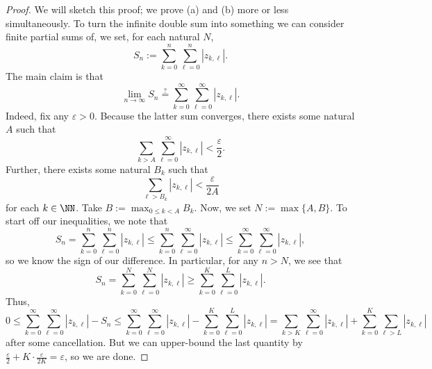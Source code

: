 \begin{proof}
	We will sketch this proof; we prove (a) and (b) more or less simultaneously. To turn the infinite double sum into something we can consider finite partial sums of, we set, for each natural $N$,
	\[S_n:=\sum_{k=0}^n\sum_{\ell=0}^n|z_{k,\ell}|.\]
	The main claim is that
	\[\lim_{n\to\infty}S_n\stackrel?=\sum_{k=0}^\infty\sum_{\ell=0}^\infty|z_{k,\ell}|.\]
	Indeed, fix any $\varepsilon>0$. Because the latter sum converges, there exists some natural $A$ such that
	\[\sum_{k>A}\sum_{\ell=0}^\infty|z_{k,\ell}|<\frac\varepsilon2.\]
	Further, there exists some natural $B_k$ such that
	\[\sum_{\ell>B_k}|z_{k,\ell}|<\frac\varepsilon{2A}\]
	for each $k\in\NN$. Take $B:=\max_{0\le k<A}B_k$. Now, we set $N:=\max\{A,B\}$. To start off our inequalities, we note that
	\[S_n=\sum_{k=0}^n\sum_{\ell=0}^n|z_{k,\ell}|\le\sum_{k=0}^n\sum_{\ell=0}^\infty|z_{k,\ell}|\le\sum_{k=0}^\infty\sum_{\ell=0}^\infty|z_{k,\ell}|,\]
	so we know the sign of our difference. In particular, for any $n>N$, we see that
	\[S_n=\sum_{k=0}^N\sum_{\ell=0}^N|z_{k,\ell}|\ge\sum_{k=0}^K\sum_{\ell=0}^L|z_{k,\ell}|.\]
	Thus,
	\[0\le\sum_{k=0}^\infty\sum_{\ell=0}^\infty|z_{k,\ell}|-S_n\le\sum_{k=0}^\infty\sum_{\ell=0}^\infty|z_{k,\ell}|-\sum_{k=0}^K\sum_{\ell=0}^L|z_{k,\ell}|=\sum_{k>K}\sum_{\ell=0}^\infty|z_{k,\ell}|+\sum_{k=0}^K\sum_{\ell>L}|z_{k,\ell}|\]
	after some cancellation. But we can upper-bound the last quantity by $\frac\varepsilon2+K\cdot\frac\varepsilon{2K}=\varepsilon$, so we are done.


\end{proof}
